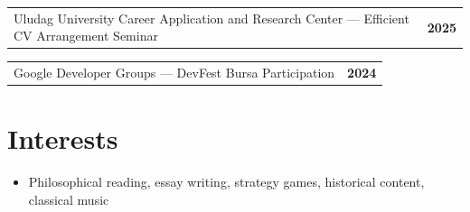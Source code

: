 \documentclass[a4paper,12pt]{article}
\begin{document}
\vspace{6pt}

\begin{tabularx}{\linewidth}{@{}X r@{}}
Uludag University Career Application and Research Center --- Efficient CV Arrangement Seminar & \textbf{2025} \\
\end{tabularx}

\vspace{6pt}

\begin{tabularx}{\linewidth}{@{}X r@{}}
Google Developer Groups --- DevFest Bursa Participation & \textbf{2024} \\
\end{tabularx}

\section{Interests}
\begin{itemize}[nosep,after=\strut, leftmargin=1.5em, itemsep=6pt,label=\textbullet]
    \item Philosophical reading, essay writing, strategy games, historical content, classical music
\end{itemize} 

\vfill
{}
\end{document}
